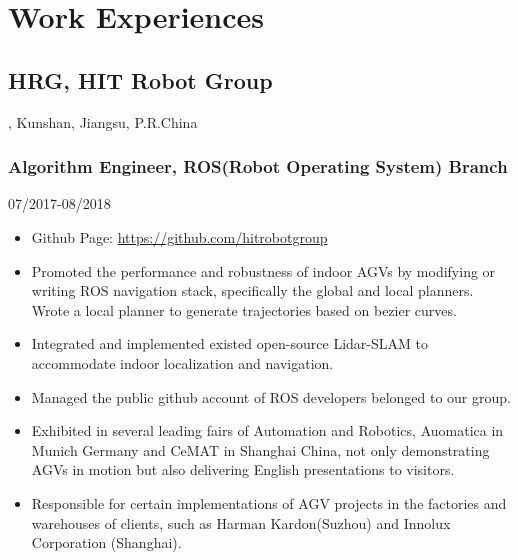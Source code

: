 \documentclass{article}
\begin{document}
\section{Work Experiences}
\subsection{HRG, HIT Robot Group}, Kunshan, Jiangsu, P.R.China
\subsubsection{Algorithm Engineer, ROS(Robot Operating System) Branch} \hfill 07/2017-08/2018
\begin{itemize}[noitemsep,topsep=1pt]
\item Github Page: \url{https://github.com/hitrobotgroup}
\item Promoted the performance and robustness of indoor AGVs by modifying or writing ROS navigation stack, specifically the global and local planners. Wrote a local planner to generate trajectories based on bezier curves.
\item Integrated and implemented existed open-source Lidar-SLAM to accommodate indoor localization and navigation.
\item Managed the public github account of ROS developers belonged to our group.  
\item Exhibited in several leading fairs of Automation and Robotics, Auomatica in Munich Germany and CeMAT in Shanghai China, not only demonstrating AGVs in motion but also delivering English presentations to visitors. 
\item Responsible for certain implementations of AGV projects in the factories and warehouses of clients, such as Harman Kardon(Suzhou) and Innolux Corporation (Shanghai).  
\end{itemize}

\end{document}
